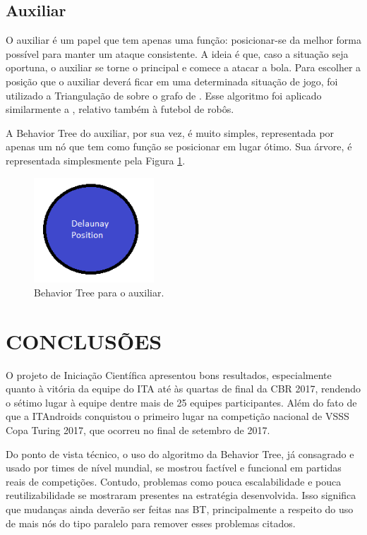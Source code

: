 \documentclass[10pt,fleqn,a4paper]{article}
\begin{document}
\subsection{Auxiliar}

	O auxiliar é um papel que tem apenas uma função: posicionar-se da melhor forma possível para manter um ataque consistente. A ideia é que, caso a situação seja oportuna, o auxiliar se torne o principal e comece a atacar a bola. Para escolher a posição que o auxiliar deverá ficar em uma determinada situação de jogo, foi utilizado a Triangulação de \cite{delaunay34} sobre o grafo de \cite{voronoi08}. Esse algoritmo foi aplicado similarmente a \cite{akiyama2007multi}, relativo também à futebol de robôs.

	A Behavior Tree do auxiliar, por sua vez, é muito simples, representada por apenas um nó que tem como função se posicionar em lugar ótimo. Sua árvore, é representada simplesmente pela Figura \ref{fig:auxiliar_bt}.

\begin{figure}[H]
	\centering
	\includegraphics[width=0.4\textwidth]{figures/Auxiliar_BT.png}
   \caption{Behavior Tree para o auxiliar.} \label{fig:auxiliar_bt}
\end{figure}

	\section{CONCLUSÕES}
	
	O projeto de Iniciação Científica apresentou bons resultados, especialmente quanto à vitória da equipe do ITA até às quartas de final da CBR 2017, rendendo o sétimo lugar à equipe dentre mais de 25 equipes participantes. Além do fato de que a ITAndroids conquistou o primeiro lugar na competição nacional de VSSS Copa Turing 2017, que ocorreu no final de setembro de 2017.

	Do ponto de vista técnico, o uso do algoritmo da Behavior Tree, já consagrado e usado por times de nível mundial, se mostrou factível e funcional em partidas reais de competições. Contudo, problemas como pouca escalabilidade e pouca reutilizabilidade se mostraram presentes na estratégia desenvolvida. Isso significa que mudanças ainda deverão ser feitas nas BT, principalmente a respeito do uso de mais nós do tipo paralelo para remover esses problemas citados.
\end{document}
